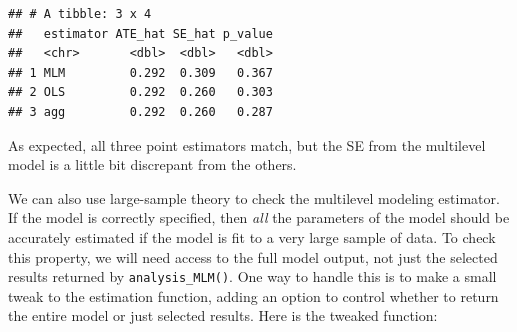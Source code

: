 \documentclass[
]{book}
\newenvironment{Shaded}{\begin{snugshade}}{\end{snugshade}}
\newcommand{\AttributeTok}[1]{\textcolor[rgb]{0.13,0.29,0.53}{#1}}
\newcommand{\ConstantTok}[1]{\textcolor[rgb]{0.56,0.35,0.01}{#1}}
\newcommand{\ControlFlowTok}[1]{\textcolor[rgb]{0.13,0.29,0.53}{\textbf{#1}}}
\newcommand{\DecValTok}[1]{\textcolor[rgb]{0.00,0.00,0.81}{#1}}
\newcommand{\FunctionTok}[1]{\textcolor[rgb]{0.13,0.29,0.53}{\textbf{#1}}}
\newcommand{\NormalTok}[1]{#1}
\newcommand{\OtherTok}[1]{\textcolor[rgb]{0.56,0.35,0.01}{#1}}
\newcommand{\SpecialCharTok}[1]{\textcolor[rgb]{0.81,0.36,0.00}{\textbf{#1}}}
\newcommand{\StringTok}[1]{\textcolor[rgb]{0.31,0.60,0.02}{#1}}
\begin{document}
\begin{verbatim}
## # A tibble: 3 x 4
##   estimator ATE_hat SE_hat p_value
##   <chr>       <dbl>  <dbl>   <dbl>
## 1 MLM         0.292  0.309   0.367
## 2 OLS         0.292  0.260   0.303
## 3 agg         0.292  0.260   0.287
\end{verbatim}

As expected, all three point estimators match, but the SE from the multilevel model is a little bit discrepant from the others.

We can also use large-sample theory to check the multilevel modeling estimator.
If the model is correctly specified, then \emph{all} the parameters of the model should be accurately estimated if the model is fit to a very large sample of data.
To check this property, we will need access to the full model output, not just the selected results returned by \texttt{analysis\_MLM()}.
One way to handle this is to make a small tweak to the estimation function, adding an option to control whether to return the entire model or just selected results.
Here is the tweaked function:

\begin{Shaded}
\end{Shaded}
\end{document}
